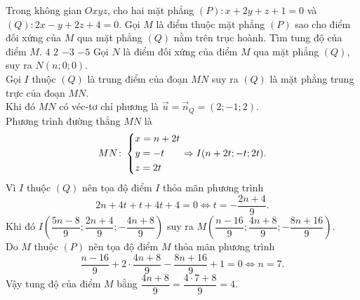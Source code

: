 \begin{ex}%
	Trong không gian $Oxyz$, cho hai mặt phẳng $(P)\colon x+2y+z+1=0$ và $(Q)\colon 2x-y+2z+4=0$. Gọi $M$ là điểm thuộc mặt phẳng $(P)$ sao cho điểm đối xứng của $M$ qua mặt phẳng $(Q)$ nằm trên trục hoành. Tìm tung độ của điểm $M$.
	\choice
	{\True $4$}
	{$2$}
	{$-3$}
	{$-5$}
	\loigiai
	{
		Gọi $N$ là điểm đối xứng của điểm $M$ qua mặt phẳng $(Q)$, suy ra $N(n;0;0)$.\\
		Gọi $I$ thuộc $(Q)$ là trung điểm của đoạn $MN$ suy ra $(Q)$ là mặt phẳng trung trực của đoạn $MN$.\\
		Khi đó $MN$ có véc-tơ chỉ phương là $\vec{u}=\vec{n}_Q=(2;-1;2)$.\\
		Phương trình đường thẳng $MN$ là\[MN\colon\left\{\begin{aligned}&x=n+2t\\&y=-t\\&z=2t\end{aligned}\right.\Rightarrow I(n+2t;-t;2t).\]
		Vì $I$ thuộc $(Q)$ nên tọa độ điểm $I$ thỏa mãn phương trình 
		\[2n+4t+t+4t+4=0\Leftrightarrow t=-\dfrac{2n+4}{9}.\]
		Khi đó $I\left(\dfrac{5n-8}{9};\dfrac{2n+4}{9};-\dfrac{4n+8}{9}\right)$ suy ra $M\left(\dfrac{n-16}{9};\dfrac{4n+8}{9};-\dfrac{8n+16}{9}\right)$.\\
		Do $M$ thuộc $(P)$ nên tọa độ điểm $M$ thỏa mãn phương trình 
		\[\dfrac{n-16}{9}+2\cdot\dfrac{4n+8}{9}-\dfrac{8n+16}{9}+1=0\Leftrightarrow n=7.\]
		Vậy tung độ của điểm $M$ bằng $\dfrac{4n+8}{9}=\dfrac{4\cdot7+8}{9}=4$.
	}
\end{ex}

